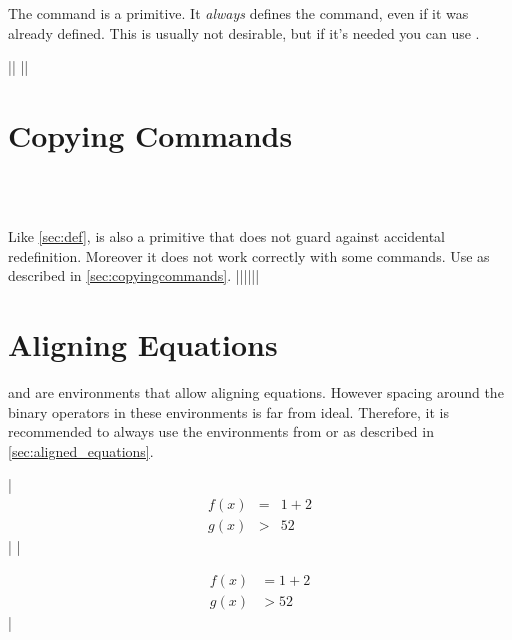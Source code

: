 The  command is a  primitive. It \emph{always} defines
the command, even if it was already defined. This is usually not desirable, but
if it's needed you can use .
\begin{chktexignore}
  \vchto|\def\foo#1#2#3{ ... }|
  ||
\end{chktexignore}

\section{Copying Commands}
 {
   \\
   \\
}

Like \autoref{sec:def},  is also a  primitive that
does not guard against accidental redefinition. Moreover it does not work
correctly with some  commands. Use  as
described in \autoref{sec:copyingcommands}.
\chto|\let\foo\bar||\NewCommandCopy\foo\bar|

\section{Aligning Equations}

 and  are  environments that allow
aligning equations. However spacing around the binary operators in these environments is far
from ideal. Therefore, it is recommended to always use the  environments
from  or  as described in
\autoref{sec:aligned_equations}.
\begin{chktexignore}
\chto
|\begin{eqnarray}
  f(x) & = &  1 + 2 \\
  g(x) & > & 52
\end{eqnarray}|
|\usepackage{amsmath}
\begin{align}
  f(x) & = 1 + 2 \\
  g(x) & > 52
\end{align}|
\end{chktexignore}

